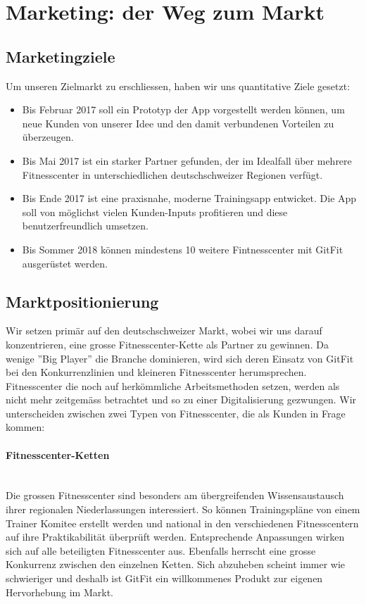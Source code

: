 \clearpage
\section{Marketing: der Weg zum Markt}\label{sec:marketing-der-weg-zum-markt}

\subsection{Marketingziele}
Um unseren Zielmarkt zu erschliessen, haben wir uns quantitative Ziele gesetzt:
\begin{itemize}
	\item Bis Februar 2017 soll ein Prototyp der App vorgestellt werden können, um neue Kunden von unserer Idee und den damit verbundenen Vorteilen zu überzeugen.
	\item Bis Mai 2017 ist ein starker Partner gefunden, der im Idealfall über mehrere Fitnesscenter in unterschiedlichen deutschschweizer Regionen verfügt.
	\item Bis Ende 2017 ist eine praxisnahe, moderne Trainingsapp entwicket. Die App soll von möglichst vielen Kunden-Inputs profitieren und diese benutzerfreundlich umsetzen.
	\item Bis Sommer 2018 können mindestens 10 weitere Fintnesscenter mit GitFit ausgerüstet werden.
\end{itemize}

\subsection{Marktpositionierung}
Wir setzen primär auf den deutschschweizer Markt, wobei wir uns darauf konzentrieren, eine grosse Fitnesscenter-Kette als Partner zu gewinnen. Da wenige ''Big Player'' die Branche dominieren, wird sich deren Einsatz von GitFit bei den Konkurrenzlinien und kleineren Fitnesscenter herumsprechen. Fitnesscenter die noch auf herkömmliche Arbeitsmethoden setzen, werden als nicht mehr zeitgemäss betrachtet und so zu einer Digitalisierung gezwungen. Wir unterscheiden zwischen zwei Typen von Fitnesscenter, die als Kunden in Frage kommen:

\paragraph{Fitnesscenter-Ketten} \hfill \\
Die grossen Fitnesscenter sind besonders am übergreifenden Wissensaustausch ihrer regionalen Niederlassungen interessiert. So können Trainingspläne von einem Trainer Komitee erstellt werden und national in den verschiedenen Fitnesscentern auf ihre Praktikabilität überprüft werden. Entsprechende Anpassungen wirken sich auf alle beteiligten Fitnesscenter aus. Ebenfalls herrscht eine grosse Konkurrenz zwischen den einzelnen Ketten. Sich abzuheben scheint immer wie schwieriger und deshalb ist GitFit ein willkommenes Produkt zur eigenen Hervorhebung im Markt. 

